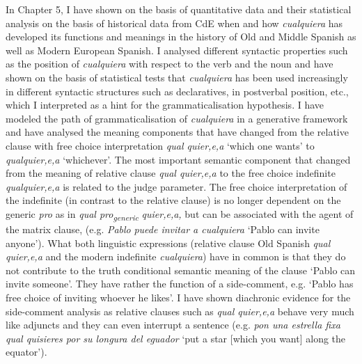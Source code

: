   In Chapter 5, I have shown on the basis of quantitative data and their statistical analysis on the basis of historical data from CdE when and how \textit{cualquiera} has developed its functions and meanings in the history of Old and Middle Spanish as well as Modern European Spanish. I analysed different syntactic properties such as the position of \textit{cualquiera} with respect to the verb and the noun and have shown on the basis of statistical tests that \textit{cualquiera} has been used increasingly in different syntactic structures such as declaratives, in postverbal position, etc., which I interpreted as a hint for the grammaticalisation hypothesis. I have modeled the path of grammaticalisation of \textit{cualquiera} in a generative framework and have analysed the meaning components that have changed from the relative clause with free choice interpretation \textit{qual quier,e,a} ‘which one wants’ to \textit{qualquier,e,a} ‘whichever’. The most important semantic component that changed from the meaning of relative clause \textit{qual quier,e,a} to the free choice indefinite \textit{qualquier,e,a} is related to the judge parameter. The free choice interpretation of the indefinite (in contrast to the relative clause) is no longer dependent on the generic \textit{pro} as in \textit{qual pro\textsubscript{generic}} \textit{quier,e,a,} but can be associated with the agent of the matrix clause, (e.g. \textit{Pablo} \textit{puede invitar a cualquiera} ‘Pablo can invite anyone’). What both linguistic expressions (relative clause Old Spanish \textit{qual quier,e,a} and the modern indefinite \textit{cualquiera}) have in common is that they do not contribute to the truth conditional semantic meaning of the clause ‘Pablo can invite someone’. They have rather the function of a side-comment, e.g. ‘Pablo has free choice of inviting whoever he likes’. I have shown diachronic evidence for the side-comment analysis as relative clauses such as \textit{qual quier,e,a} behave very much like adjuncts and they can even interrupt a sentence (e.g. \textit{pon una estrella fixa qual quisieres por su longura del eguador}  ‘put a star [which you want] along the equator’).

